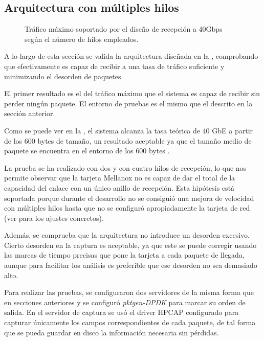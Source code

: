 \documentclass[oneside, draft]{epstfg}
\begin{document}
\subsection{Arquitectura con múltiples hilos}

\begin{figure}[b]
\caption[Capacidad del diseño de recepción a 40 Gbps]{Tráfico máximo soportado por el diseño de recepción a 40Gbps según el número de hilos empleados.}
\label{fig:Validacion:MulticoreMaxRate}
\end{figure}

A lo largo de esta sección se valida la arquitectura diseñada en la , comprobando que efectivamente es capaz de recibir a una tasa de tráfico suficiente y minimizando el desorden de paquetes.

El primer resultado es el del tráfico máximo que el sistema es capaz de recibir sin perder ningún paquete. El entorno de pruebas es el mismo que el descrito en la sección anterior.

Como se puede ver en la , el sistema alcanza la tasa teórica de 40 GbE a partir de los 600 bytes de tamaño, un resultado aceptable ya que el tamaño medio de paquete se encuentra en el entorno de los 600 bytes \cite{john2007analysis}.

La prueba se ha realizado con dos y con cuatro hilos de recepción, lo que nos permite observar que la tarjeta Mellanox no es capaz de dar el total de la capacidad del enlace con un único anillo de recepción. Esta hipótesis está soportada porque durante el desarrollo no se consiguió una mejora de velocidad con múltiples hilos hasta que no se configuró apropiadamente la tarjeta de red (ver  para los ajustes concretos).

Además, se comprueba que la arquitectura no introduce un desorden excesivo. Cierto desorden en la captura es aceptable, ya que este se puede corregir usando las marcas de tiempo precisas que pone la tarjeta a cada paquete de llegada, aunque para facilitar los análisis es preferible que ese desorden no sea demasiado alto.

Para realizar las pruebas, se configuraron dos servidores de la misma forma que en secciones anteriores y se configuró \textit{pktgen-DPDK} para marcar su orden de salida. En el servidor de captura se usó el driver HPCAP configurado para capturar únicamente los campos correspondientes de cada paquete, de tal forma que se pueda guardar en disco la información necesaria sin pérdidas.
\end{document}
